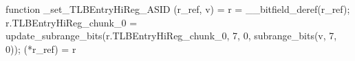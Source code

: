 function _set_TLBEntryHiReg_ASID (r_ref, v) = {
    r = __bitfield_deref(r_ref);
    r.TLBEntryHiReg_chunk_0 = update_subrange_bits(r.TLBEntryHiReg_chunk_0, 7, 0, subrange_bits(v, 7, 0));
    (*r_ref) = r
}
